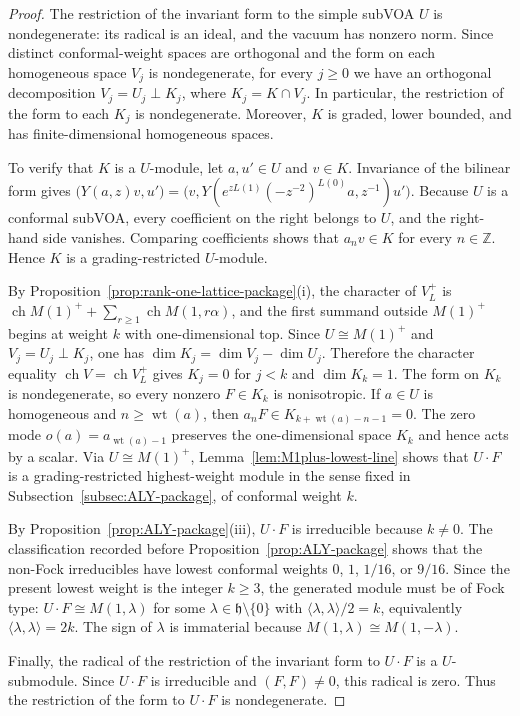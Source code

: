\documentclass[10pt,a4paper]{amsart}
\numberwithin{equation}{section} \newtheorem{thm}{Theorem}[section] \newtheorem{lem}[thm]{Lemma} \newtheorem{ex}[thm]{Example} \newtheorem{prop}[thm]{Proposition} \newtheorem{cor}[thm]{Corollary} \newtheorem{defi}[thm]{Definition} \newtheorem{rmk}[thm]{Remark} \newtheorem{notation}[thm]{Notation}
\newcommand{\wt}{\operatorname{wt}}
\newcommand{\ch}{\operatorname{ch}}
\def\Z{\mathbb{Z}} \def\N{\mathbb{N}} \def\A{\mathbb{A}} \def\C{\mathbb{C}} \def\R{\mathbb{R}} \def\Q{\mathbb{Q}} \def\F{\mathbb{F}}
\begin{document}
\begin{proof}
The restriction of the invariant form to the simple subVOA $U$ is nondegenerate: its radical is an ideal, and the vacuum has nonzero norm. Since distinct conformal-weight spaces are orthogonal and the form on each homogeneous space $V_j$ is nondegenerate, for every $j\ge0$ we have an orthogonal decomposition \(V_j=U_j\perp K_j\), where $K_j=K\cap V_j$. In particular, the restriction of the form to each $K_j$ is nondegenerate. Moreover, $K$ is graded, lower bounded, and has finite-dimensional homogeneous spaces.

To verify that $K$ is a $U$-module, let $a,u'\in U$ and $v\in K$. Invariance of the bilinear form gives \(\bigl(Y(a,z)v,u'\bigr)=\bigl(v,Y(e^{zL(1)}(-z^{-2})^{L(0)}a,z^{-1})u'\bigr).\) Because $U$ is a conformal subVOA, every coefficient on the right belongs to $U$, and the right-hand side vanishes. Comparing coefficients shows that $a_nv\in K$ for every $n\in\Z$. Hence $K$ is a grading-restricted $U$-module.

By Proposition~\ref{prop:rank-one-lattice-package}(i), the character of $V_L^+$ is \(\ch M(1)^++\sum_{r\ge1}\ch M(1,r\alpha)\), and the first summand outside $M(1)^+$ begins at weight $k$ with one-dimensional top. Since $U\cong M(1)^+$ and \(V_j=U_j\perp K_j\), one has \(\dim K_j=\dim V_j-\dim U_j\). Therefore the character equality \(\ch V=\ch V_L^+\) gives $K_j=0$ for $j<k$ and $\dim K_k=1$. The form on $K_k$ is nondegenerate, so every nonzero $F\in K_k$ is nonisotropic. If $a\in U$ is homogeneous and $n\ge\wt(a)$, then \(a_nF\in K_{k+\wt(a)-n-1}=0\). The zero mode $o(a)=a_{\wt(a)-1}$ preserves the one-dimensional space $K_k$ and hence acts by a scalar. Via $U\cong M(1)^+$, Lemma~\ref{lem:M1plus-lowest-line} shows that $U\cdot F$ is a grading-restricted highest-weight module in the sense fixed in Subsection~\ref{subsec:ALY-package}, of conformal weight $k$.

By Proposition~\ref{prop:ALY-package}(iii), $U\cdot F$ is irreducible because $k\ne0$. The classification recorded before Proposition~\ref{prop:ALY-package} shows that the non-Fock irreducibles have lowest conformal weights $0$, $1$, $1/16$, or $9/16$. Since the present lowest weight is the integer $k\ge3$, the generated module must be of Fock type: \(U\cdot F\cong M(1,\lambda)\) for some $\lambda\in\mathfrak h\setminus\{0\}$ with \(\langle\lambda,\lambda\rangle/2=k\), equivalently \(\langle\lambda,\lambda\rangle=2k\). The sign of $\lambda$ is immaterial because $M(1,\lambda)\cong M(1,-\lambda)$.

Finally, the radical of the restriction of the invariant form to $U\cdot F$ is a $U$-submodule. Since $U\cdot F$ is irreducible and $(F,F)\ne0$, this radical is zero. Thus the restriction of the form to $U\cdot F$ is nondegenerate.
\end{proof}
\end{document}

